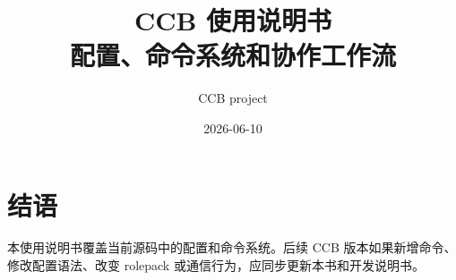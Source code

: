\documentclass[12pt,openany]{book}
\title{CCB 使用说明书\\\large 配置、命令系统和协作工作流}
\author{CCB project}
\date{2026-06-10}
\begin{document}
\frontmatter
{}
\tableofcontents



\mainmatter









\appendix




\backmatter
\chapter*{结语}
本使用说明书覆盖当前源码中的配置和命令系统。后续 CCB 版本如果新增命令、修改配置语法、改变 rolepack 或通信行为，应同步更新本书和开发说明书。
\end{document}
